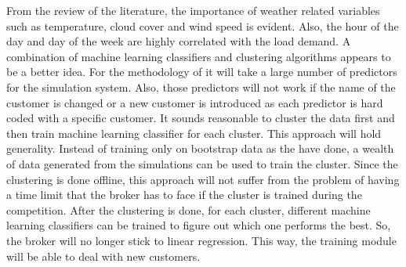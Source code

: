 From the review of the literature, the importance of weather related variables such as temperature, cloud cover and wind speed is evident. Also, the hour of the day and day of the week are highly correlated with the load demand. A combination of machine learning classifiers and clustering algorithms appears to be a better idea. For the methodology of \cite{parra2013initial} it will take a large number of predictors for the simulation system. Also, those predictors will not work if the name of the customer is changed or a new customer is introduced as each predictor is hard coded with a specific customer. It sounds reasonable to cluster the data first and then train machine learning classifier for each cluster. This approach will hold generality. Instead of training only on bootstrap data as the \cite{wang2015gongbroker} have done, a wealth of data generated from the simulations can be used to  train the cluster. Since the clustering is done offline, this approach will not  suffer from the problem of having a time limit that the broker has to face if the cluster is trained during the competition. After the clustering is done, for each cluster, different machine learning classifiers can be trained to figure out which one performs the best. So, the broker will no longer stick to linear regression. This way, the training module will be able to deal with new customers.

